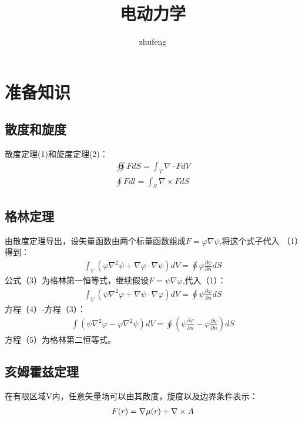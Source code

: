 \documentclass[UTF8]{article}
\begin{document}
\title{电动力学}
\author{zhufeng}
\date{}
\maketitle
\tableofcontents
\newpage
\section{准备知识}
\subsection{散度和旋度}
散度定理(1)和旋度定理(2)：
\begin{align}
    \oiint F dS = \int_V \nabla \cdot F dV \\
    \oint F dl = \int _S \nabla\times F dS
\end{align}
\subsection{格林定理}
由散度定理导出，设矢量函数由两个标量函数组成$F = \varphi \nabla \psi$,将这个式子代入
（1）得到：
\begin{align}
    \int _V (\varphi\nabla^2\psi+\nabla \varphi\cdot \nabla \psi) dV = \oint \varphi
    \frac{\partial \psi}{\partial n}dS
\end{align}
公式（3）为格林第一恒等式，继续假设$F = \psi \nabla \varphi$,代入（1）：
\begin{align}
    \int _V (\psi\nabla^2\varphi+\nabla \psi\cdot \nabla \varphi) dV = \oint \psi
    \frac{\partial \varphi}{\partial n}dS
\end{align}
方程（4）-方程（3）：
\begin{align}
    \int( \psi\nabla^2\varphi-\varphi\nabla^2\psi) dV = \oint  (\psi
    \frac{\partial \varphi}{\partial n}-\varphi\frac{\partial \psi}{\partial n}) dS
\end{align}
方程（5）为格林第二恒等式。
\subsection{亥姆霍兹定理}
在有限区域V内，任意矢量场可以由其散度，旋度以及边界条件表示：
\begin{align}
    F(r)=\-\nabla \mu(r) + \nabla\times A
\end{align}
\end{document}
